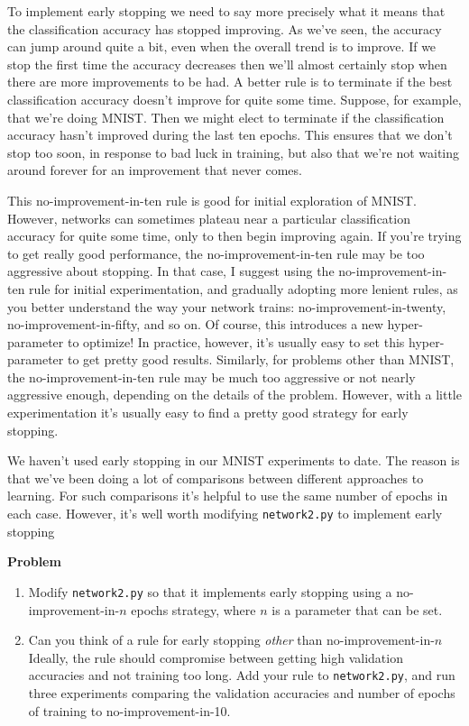 To implement early stopping we need to say more precisely what it means that the classification accuracy has stopped improving. As we've seen, the accuracy can jump around quite a bit, even when the overall trend is to improve. If we stop the first time the accuracy decreases then we'll almost certainly stop when there are more improvements to be had. A better rule is to terminate if the best classification accuracy doesn't improve for quite some time. Suppose, for example, that we're doing MNIST. Then we might elect to terminate if the classification accuracy hasn't improved during the last ten epochs. This ensures that we don't stop too soon, in response to bad luck in training, but also that we're not waiting around forever for an improvement that never comes.

This no-improvement-in-ten rule is good for initial exploration of MNIST. However, networks can sometimes plateau near a particular classification accuracy for quite some time, only to then begin improving again. If you're trying to get really good performance, the no-improvement-in-ten rule may be too aggressive about stopping. In that case, I suggest using the no-improvement-in-ten rule for initial experimentation, and gradually adopting more lenient rules, as you better understand the way your network trains: no-improvement-in-twenty, no-improvement-in-fifty, and so on. Of course, this introduces a new hyper-parameter to optimize! In practice, however, it's usually easy to set this hyper-parameter to get pretty good results. Similarly, for problems other than MNIST, the no-improvement-in-ten rule may be much too aggressive or not nearly aggressive enough, depending on the details of the problem. However, with a little experimentation it's usually easy to find a pretty good strategy for early stopping.

We haven't used early stopping in our MNIST experiments to date. The reason is that we've been doing a lot of comparisons between different approaches to learning. For such comparisons it's helpful to use the same number of epochs in each case. However, it's well worth modifying \lstinline{network2.py} to implement early stopping

\textbf{Problem}

\begin{enumerate}
\item Modify \lstinline{network2.py} so that it implements early stopping using a no-improvement-in-$n$ epochs strategy, where $n$ is a parameter that can be set.
\item Can you think of a rule for early stopping \textit{other} than no-improvement-in-$n$ Ideally, the rule should compromise between getting high validation accuracies and not training too long. Add your rule to \lstinline{network2.py}, and run three experiments comparing the validation accuracies and number of epochs of training to no-improvement-in-10.
    \end{enumerate}

